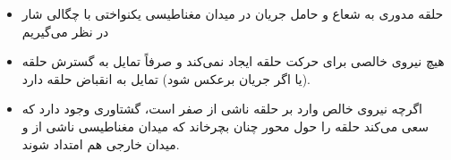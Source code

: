 \begin{ELunit}

\begin{itemize}
\tightlist
\item
  حلقه مدوری به شعاع  و حامل جریان  در میدان مغناطیسی یکنواختی با چگالی شار  در نظر می‌گیریم
\end{itemize}



\begin{itemize}
\tightlist
\item
   هیچ نیروی خالصی برای حرکت حلقه ایجاد نمی‌کند و صرفاً تمایل به گسترش حلقه (یا اگر جریان برعکس شود) تمایل به انقباض حلقه دارد.
\item
  اگرچه نیروی خالص وارد بر حلقه ناشی از  صفر است، گشتاوری وجود دارد که سعی می‌کند حلقه را حول محور  چنان بچرخاند که میدان مغناطیسی ناشی از  و میدان خارجی  هم امتداد شوند.
\end{itemize}


\end{ELunit}

\begin{ELimportant}{}


\end{ELimportant}

